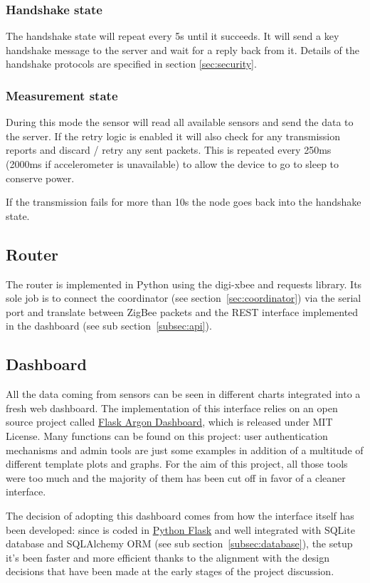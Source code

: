 \documentclass[a4paper,11pt]{scrartcl}
\begin{document}
\subsubsection*{Handshake state}
The handshake state will repeat every 5s until it succeeds. It will send a key handshake message to the server and wait for a reply back from it. Details of the handshake protocols are specified in section \ref{sec:security}.

\subsubsection*{Measurement state}
During this mode the sensor will read all available sensors and send the data to the server. If the retry logic is enabled it will also check for any transmission reports and discard / retry any sent packets. This is repeated every 250ms (2000ms if accelerometer is unavailable) to allow the device to go to sleep to conserve power.

If the transmission fails for more than 10s the node goes back into the handshake state.

\subsection{Router}\label{subsec:router}
The router is implemented in Python using the digi-xbee and requests library. Its sole job is to connect the coordinator (see section~\ref{sec:coordinator}) via the serial port and translate between ZigBee packets and the REST interface implemented in the dashboard (see sub section~\ref{subsec:api}).

\subsection{Dashboard}
All the data coming from sensors can be seen in different charts integrated into a fresh web dashboard. The implementation of this interface relies on an open source project called \href{https://github.com/app-generator/flask-argon-dashboard}{Flask Argon Dashboard}, which is released under MIT License. Many functions can be found on this project: user authentication mechanisms and admin tools are just some examples in addition of a multitude of different template plots and graphs. For the aim of this project, all those tools were too much and the majority of them has been cut off in favor of a cleaner interface.

The decision of adopting this dashboard comes from how the interface itself has been developed: since is coded in \href{https://palletsprojects.com/p/flask/}{Python Flask} and well integrated with SQLite database and SQLAlchemy ORM (see sub section~\ref{subsec:database}), the setup it's been faster and more efficient thanks to the alignment with the design decisions that have been made at the early stages of the project discussion.
\end{document}
